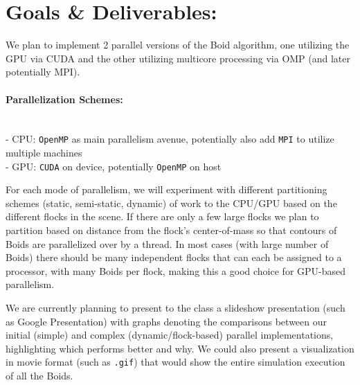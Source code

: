\documentclass[12pt]{article}
\begin{document}
\section*{Goals \& Deliverables:} 
We plan to implement 2 parallel versions of the Boid algorithm, one utilizing the GPU via CUDA and the other utilizing multicore processing via OMP (and later potentially MPI).
\paragraph*{Parallelization Schemes:}$~$\\
- CPU: \texttt{OpenMP} as main parallelism avenue, potentially also add \texttt{MPI} to utilize multiple machines\\
- GPU: \texttt{CUDA} on device, potentially \texttt{OpenMP} on host \\
\par For each mode of parallelism, we will experiment with different partitioning schemes (static, semi-static, dynamic) of work to the CPU/GPU based on the different flocks in the scene. If there are only a few large flocks we plan to partition based on distance from the flock's center-of-mass so that contours of Boids are parallelized over by a thread. In most cases (with large number of Boids) there should be many independent flocks that can each be assigned to a processor, with many Boids per flock, making this a good choice for GPU-based parallelism. 
\par We are currently planning to present to the class a slideshow presentation (such as Google Presentation) with graphs denoting the comparisons between our initial (simple) and complex (dynamic/flock-based) parallel implementations, highlighting which performs better and why. We could also present a visualization in movie format (such as  \texttt{.gif}) that would show the entire simulation execution of all the Boids. 
\end{document}
